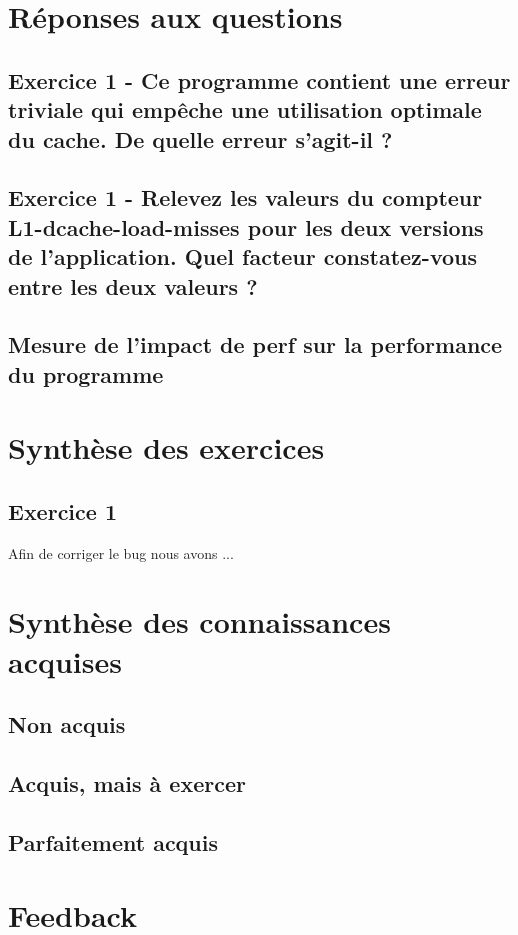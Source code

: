 \documentclass{ReportTemplate}
\begin{document}
\section{Réponses aux questions}
\subsection{Exercice 1 - Ce programme contient une erreur triviale qui empêche
une utilisation optimale du cache. De quelle erreur s’agit-il ?}

\subsection{Exercice 1 - Relevez les valeurs du compteur L1-dcache-load-misses
pour les deux versions de l’application. Quel facteur constatez-vous entre les
deux valeurs ?}

\subsection{Mesure de l'impact de perf sur la performance du programme}

\section{Synthèse des exercices}
\subsection{Exercice 1}
Afin de corriger le bug nous avons ...
\section{Synthèse des connaissances acquises}
\subsection{Non acquis}

\subsection{Acquis, mais à exercer}

\subsection{Parfaitement acquis}

\section{Feedback}
\end{document}
